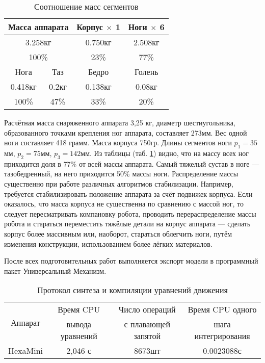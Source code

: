 \begin{table}
\begin{center}
	\begin{tabular}{|c|c|c|c|}
	\hline
	\multicolumn{2}{|c|}{Масса аппарата} & Корпус $\times$ 1 &  Ноги $\times$ 6\\  \hline
	\multicolumn{2}{|c|}{3.258кг}               & 0.750кг                 & 2.508кг              \\	\hline
	\multicolumn{2}{|c|}{100\%}                 & 23\%                     & 77\%                  \\	\hline \hline
	Нога     & Таз             & Бедро                    & Голень              \\ \hline
	0.418кг & 0.2кг & 0.138кг & 0.08кг\\	\hline
	100\%&47\%&33\%&20\%\\	\hline
	\end{tabular}
	\label{tab:masses_ratio}
\end{center}
\caption{Соотношение масс сегментов}
\end{table}

Расчётная масса снаряженного аппарата 3,25 кг, диаметр шестиугольника, образованного точками крепления ног аппарата, составляет 273мм. Вес одной ноги составляет 418 грамм. Масса корпуса 750гр. Длины сегментов ноги $p_1=35$мм, $p_2=75$мм, $p_3=142$мм. Из таблицы (таб. \ref{tab:masses_ratio}) видно, что на массу всех ног приходится доля в 77\% от всей массы аппарата. Самый тяжелый сустав в ноге --- тазобедренный, на него приходится 50\% массы ноги. Распределение массы существенно при работе различных алгоритмов стабилизации. Например, требуется стабилизировать положение аппарата за счёт подвижек корпуса. Если оказалось, что масса корпуса не существенна по сравнению с массой ног, то следует пересматривать компановку робота, проводить перераспределение массы робота и стараться переместить тяжёлые детали на корпус аппарата --- сделать корпус более массивным или, наоборот,  стараться облегчить ноги, путём изменения конструкции, использованием более лёгких материалов.


После всех подготовительных работ выполняется экспорт модели в программный пакет Универсальный Механизм.

\begin{table}
\begin{center}
	\begin{tabular}{|c|c|c|c|}
	\hline
	\multirow{2}{*}{Аппарат} & Время CPU &Число операций  & Время CPU одного \\ &вывода уравнений &с плавающей запятой &шага интегрирования\\
	\hline
	HexaMini&2,046 с&8673шт&0.0023088с\\ 
	\hline
	\end{tabular}
\end{center}
\caption{Протокол синтеза и компиляции уравнений движения}
\end{table}

